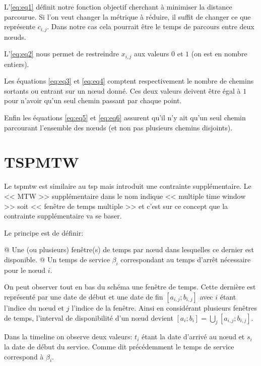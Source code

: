 \documentclass[final]{polytech/polytech}
\begin{document}
		L'\autoref{eq:eq1} définit notre fonction objectif cherchant à minimiser la distance parcourue.
		Si l'on veut changer la métrique à réduire, il suffit de changer ce que représente $c_{i,j}$.
		Dans notre cas cela pourrait être le temps de parcours entre deux n\oe uds.
		
		L'\autoref{eq:eq2} nous permet de restreindre $x_{i,j}$ aux valeurs $0$ et $1$ (on est en nombre entiers).
		
		Les équations \autoref{eq:eq3} et \autoref{eq:eq4} comptent respectivement le nombre de chemins sortants ou entrant sur un n\oe ud donné.
		Ces deux valeurs deivent être égal à $1$ pour n'avoir qu'un seul chemin passant par chaque point.
		
		Enfin les équations \autoref{eq:eq5} et \autoref{eq:eq6} assurent qu'il n'y ait qu'un seul chemin parcourant l'ensemble des n\oe uds (et non pas plusieurs chemins disjoints).
		
	
	\section{TSPMTW}
		Le \gls{tspmtw} est similaire au \gls{tsp} mais introduit une contrainte supplémentaire.
		Le << MTW >> supplémentaire dans le nom indique << multiple time window >> soit << fenêtre de temps multiple >> et c'est sur ce concept que la contrainte supplémentaire va se baser.
		
		Le principe est de définir:
		\begin{easylist}
			@ Une (ou plusieurs) fenêtre(s) de temps par n\oe ud dans lesquelles ce dernier est disponible.
			@ Un temps de service $\beta_i$ correspondant au temps d'arrêt nécessaire pour le n\oe ud $i$.
		\end{easylist}

		 
		On peut observer tout en bas du schéma une fenêtre de temps.
		Cette dernière est représenté par une date de début et une date de fin $\left[ a_{i,j}; b_{i,j}\right]$ avec $i$ étant l'indice du n\oe ud et $j$ l'indice de la fenêtre.
		Ainsi en considérant plusieurs fenêtres de temps, l'interval de disponibilité d'un n\oe ud devient $\left[ a_i;b_i\right] =\bigcup_j\left[ a_{i,j}; b_{i,j}\right]$.
		
		Dans la timeline on observe deux valeurs: $t_i$ étant la date d'arrivé au n\oe ud et $s_i$ la date de début du service.
		Comme dit précédemment le temps de service correspond à $\beta_i$.
		
\end{document}
